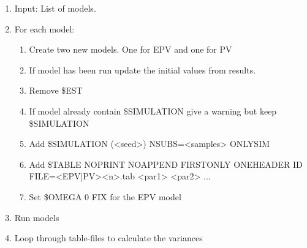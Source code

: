 \begin{enumerate}
	\item Input: List of models.
	\item For each model:
	\begin{enumerate}
		\item Create two new models. One for EPV and one for PV
		\item If model has been run update the initial values from results.
		\item Remove \$EST
		\item If model already contain \$SIMULATION give a warning but keep \$SIMULATION
		\item Add \$SIMULATION (<seed>) NSUBS=<samples> ONLYSIM
		\item Add \$TABLE NOPRINT NOAPPEND FIRSTONLY ONEHEADER ID FILE=<EPV|PV><n>.tab <par1> <par2> ...
		\item Set \$OMEGA 0 FIX for the EPV model
	\end{enumerate}
	\item Run models
	\item Loop through table-files to calculate the variances
\end{enumerate}


